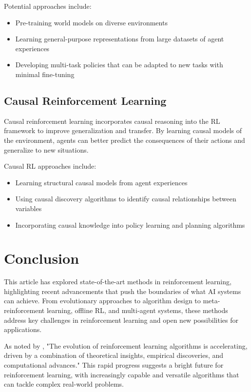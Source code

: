 \documentclass{article}
\begin{document}
Potential approaches include:
\begin{itemize}
    \item Pre-training world models on diverse environments
    \item Learning general-purpose representations from large datasets of agent experiences
    \item Developing multi-task policies that can be adapted to new tasks with minimal fine-tuning
\end{itemize}

\subsection{Causal Reinforcement Learning}

Causal reinforcement learning incorporates causal reasoning into the RL framework to improve generalization and transfer. By learning causal models of the environment, agents can better predict the consequences of their actions and generalize to new situations.

Causal RL approaches include:
\begin{itemize}
    \item Learning structural causal models from agent experiences
    \item Using causal discovery algorithms to identify causal relationships between variables
    \item Incorporating causal knowledge into policy learning and planning algorithms
\end{itemize}

\section{Conclusion}

This article has explored state-of-the-art methods in reinforcement learning, highlighting recent advancements that push the boundaries of what AI systems can achieve. From evolutionary approaches to algorithm design to meta-reinforcement learning, offline RL, and multi-agent systems, these methods address key challenges in reinforcement learning and open new possibilities for applications.

As noted by \cite{google2023}, "The evolution of reinforcement learning algorithms is accelerating, driven by a combination of theoretical insights, empirical discoveries, and computational advances." This rapid progress suggests a bright future for reinforcement learning, with increasingly capable and versatile algorithms that can tackle complex real-world problems.
\end{document}
